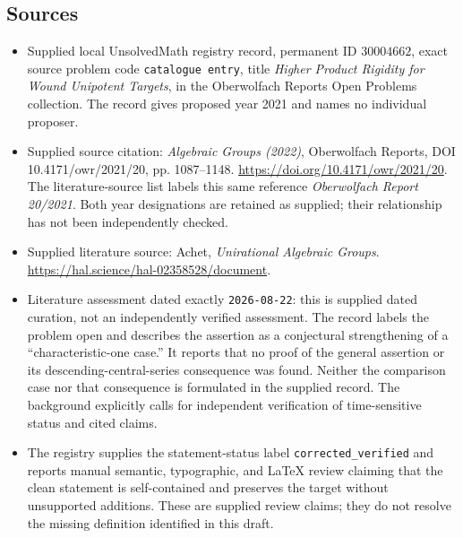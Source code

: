 \documentclass[11pt]{article}
\begin{document}
\subsection{Sources}
\begin{itemize}
\item Supplied local UnsolvedMath registry record, permanent ID \(30004662\), exact source problem code \texttt{catalogue entry}, title \emph{Higher Product Rigidity for Wound Unipotent Targets}, in the Oberwolfach Reports Open Problems collection. The record gives proposed year 2021 and names no individual proposer.
\item Supplied source citation: \emph{Algebraic Groups (2022)}, Oberwolfach Reports, DOI 10.4171/owr/2021/20, pp. 1087--1148. \url{https://doi.org/10.4171/owr/2021/20}. The literature-source list labels this same reference \emph{Oberwolfach Report 20/2021}. Both year designations are retained as supplied; their relationship has not been independently checked.
\item Supplied literature source: Achet, \emph{Unirational Algebraic Groups}. \url{https://hal.science/hal-02358528/document}.
\item Literature assessment dated exactly \texttt{2026-08-22}: this is supplied dated curation, not an independently verified assessment. The record labels the problem open and describes the assertion as a conjectural strengthening of a ``characteristic-one case.'' It reports that no proof of the general assertion or its descending-central-series consequence was found. Neither the comparison case nor that consequence is formulated in the supplied record. The background explicitly calls for independent verification of time-sensitive status and cited claims.
\item The registry supplies the statement-status label \texttt{corrected\_verified} and reports manual semantic, typographic, and LaTeX review claiming that the clean statement is self-contained and preserves the target without unsupported additions. These are supplied review claims; they do not resolve the missing definition identified in this draft.
\end{itemize}
\end{document}

